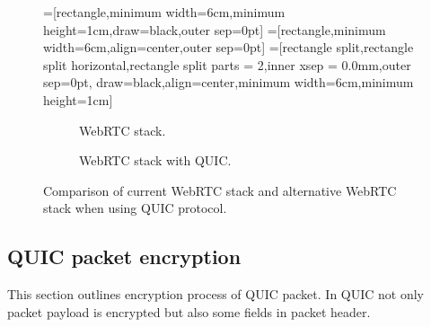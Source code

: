 \begin{figure}
    \centering
    =[rectangle,minimum width=6cm,minimum height=1cm,draw=black,outer sep=0pt]
    =[rectangle,minimum width=6cm,align=center,outer sep=0pt]
    =[rectangle split,rectangle split horizontal,rectangle split parts = 2,inner xsep = 0.0mm,outer sep=0pt,
    draw=black,align=center,minimum width=6cm,minimum height=1cm]
    \begin{subfigure}[b]{0.4\textwidth}
        \caption{WebRTC stack.}
        \label{fig:webrtc-stack-comparision-standard}
    \end{subfigure}
    \hfill
    \begin{subfigure}[b]{0.4\textwidth}
        \caption{WebRTC stack with QUIC.}
        \label{fig:webrtc-stack-comparision-quic}
    \end{subfigure}
    \caption{Comparison of current WebRTC stack and alternative WebRTC stack when using QUIC protocol.}
    \label{fig:webrtc-stack-comparision}
\end{figure}

\subsection{QUIC packet encryption}
\label{subsec:packet-encryption}
This section outlines encryption process of QUIC packet.
In QUIC not only packet payload is encrypted but also some fields in packet header.

